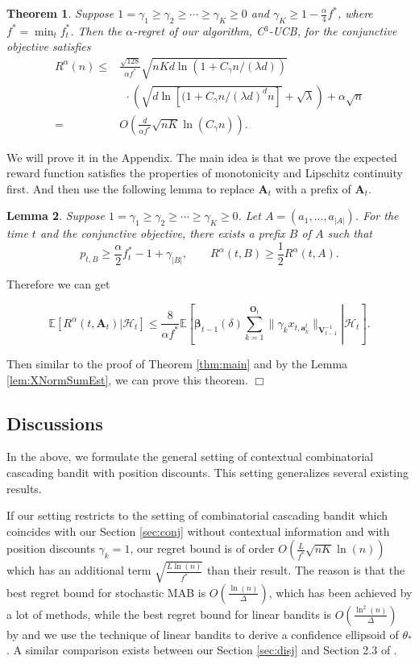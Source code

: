 \documentclass{article}
\newcommand{\bbeta}{\boldsymbol{\beta}}
\newcommand{\EE}{\mathbb{E}}
\newcommand{\bA}{\mathbf{A}}
\newcommand{\ba}{\mathbf{a}}
\newcommand{\bO}{\mathbf{O}}
\newcommand{\bV}{\mathbf{V}}
\newcommand{\cH}{\mathcal{H}}
\newcommand{\abs}[1]{\left| #1 \right|}
\newcommand{\norm}[1]{\| #1 \|}
\newtheorem{theorem}{Theorem}[section]
\newtheorem{lemma}[theorem]{Lemma}%
\newenvironment{proof}{\noindent {\textbf{Proof. }}}{$\Box$ \medskip}
\newcommand{\CLemmaPrefixExi}{
	Suppose $1 = \gamma_1 \geq \gamma_2 \geq \cdots \geq \gamma_K \geq 0$. Let $A = (a_1, ..., a_{\abs{A}})$. For the time $t$ and the conjunctive objective, there exists a prefix $B$ of $A$ such that 
	$$
	p_{t, B} \geq \frac{\alpha}{2}f_{t}^{\ast} - 1 + \gamma_{\abs{B}}, \qquad R^{\alpha}(t, B) \geq \frac{1}{2} R^{\alpha}(t, A).
	$$ 
}
\newcommand{\CEqDeltaEstAnd}{
	$$
	\EE [R^{\alpha}(t, \bA_t) |\cH_t ] \leq \frac{8}{\alpha f^{\ast}} \EE \left[ \left. \bbeta_{t-1}(\delta)\sum_{k=1}^{\bO_t}\norm{\gamma_k x_{t,\ba_k^t}}_{\bV_{t-1}^{-1}} \right| \cH_t\right].
	$$
}
\begin{document}
\begin{theorem} %
	\label{thm:and}
	Suppose $1 = \gamma_1 \geq \gamma_2 \geq \cdots \geq \gamma_{K} \geq 0$ and $\gamma_K \geq 1 - \frac{\alpha}{4} f^{\ast}$, where $f^* = \min_{t} f_t^{\ast}$. Then the $\alpha$-regret of our algorithm, C$^3$-UCB, for the conjunctive objective satisfies
	\begin{align}
		R^{\alpha}(n) \le& \frac{\sqrt{128}}{\alpha f^{\ast}} \sqrt{nKd\ln(1 + C_\gamma n/(\lambda d))} \nonumber \\
		&~~ \cdot \left(\sqrt{d\ln[(1 + C_\gamma n/(\lambda d)^d n] } + \sqrt{\lambda}\right) + \alpha \sqrt{n} \nonumber \\
		=&O\left(\frac{d}{\alpha f^{\ast}}\sqrt{nK} \ln(C_{\gamma} n) \right).
	\end{align}
\end{theorem}
\begin{proof}
	We will prove it in the Appendix. The main idea is that we prove the expected reward function satisfies the properties of monotonicity and Lipschitz continuity first. And then use the following lemma to replace $\bA_t$ with a prefix of $\bA_t$.
	\begin{lemma}
		\CLemmaPrefixExi
	\end{lemma}
	
	Therefore we can get
	\CEqDeltaEstAnd
	
	Then similar to the proof of Theorem \ref{thm:main} and by the Lemma \ref{lem:XNormSumEst}, we can prove this theorem.
\end{proof}


\subsection{Discussions}
\label{sec:diss}

In the above, we formulate the general setting of contextual combinatorial cascading bandit with position discounts. This setting generalizes several existing results. 

If our setting restricts to the setting of combinatorial cascading bandit \cite{kveton2015combinatorial} which coincides with our Section \ref{sec:conj} without contextual information and with position discounts $\gamma_k = 1$, our regret bound is of order $O\left(\frac{L}{f^*}\sqrt{nK}\ln(n)\right)$ which has an additional term $\sqrt{\frac{L\ln(n)}{f^*}}$ than their result. The reason is that the best regret bound for stochastic MAB is $O(\frac{\ln(n)}{\Delta})$, which has been achieved by a lot of methods, while the best regret bound for linear bandits is $O\left(\frac{\ln^2(n)}{\Delta}\right)$ by \cite{abbasi2011improved} and we use the technique of linear bandits to derive a confidence ellipsoid of $\theta_{\ast}$. A similar comparison exists between our Section \ref{sec:disj} and Section 2.3 of \cite{kveton2015combinatorial}.
\end{document}
